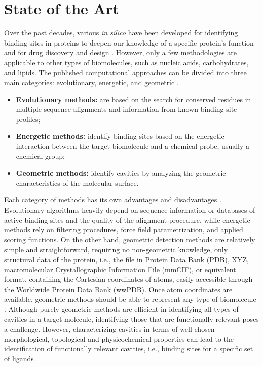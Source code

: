 \documentclass[Ingles]{phdthesis}
\def\ie{i.e.\onedot}
\begin{document}
\section{State of the Art \label{sec:state-of-the-art}}

Over the past decades, various \textit{in silico} have been developed for identifying binding sites in proteins to deepen our knowledge of a specific protein's function and for drug discovery and design \cite{liang1998}. However, only a few methodologies are applicable to other types of biomolecules, such as nucleic acids, carbohydrates, and lipids. The published computational approaches can be divided into three main categories: evolutionary, energetic, and geometric \cite{oliveira2014,simoes2017,guerra2019}.

\begin{itemize}
  \item \textbf{Evolutionary methods:} are based on the search for conserved residues in multiple sequence alignments and information from known binding site profiles;
  \item \textbf{Energetic methods:} identify binding sites based on the energetic interaction between the target biomolecule and a chemical probe, usually a chemical group;
  \item \textbf{Geometric methods:} identify cavities by analyzing the geometric characteristics of the molecular surface.
\end{itemize}

Each category of methods has its own advantages and disadvantages \cite{sotriffer2002,henrich2010,simoes2017}. Evolutionary algorithms heavily depend on sequence information or databases of active binding sites and the quality of the alignment procedure, while energetic methods rely on filtering procedures, force field parametrization, and applied scoring functions. On the other hand, geometric detection methods are relatively simple and straightforward, requiring no non-geometric knowledge, only structural data of the protein, \ie, the file in Protein Data Bank (PDB), XYZ, macromolecular Crystallographic Information File (mmCIF), or equivalent format, containing the Cartesian coordinates of atoms, easily accessible through the Worldwide Protein Data Bank (wwPDB). Once atom coordinates are available, geometric methods should be able to represent any type of biomolecule \cite{henrich2010,oliveira2014,simoes2017}. Although purely geometric methods are efficient in identifying all types of cavities in a target molecule, identifying those that are functionally relevant poses a challenge. However, characterizing cavities in terms of well-chosen morphological, topological and physicochemical properties can lead to the identification of functionally relevant cavities, \ie, binding sites for a specific set of ligands \cite{sotriffer2002,henrich2010,liang1998,guerra2019}. 
\end{document}
